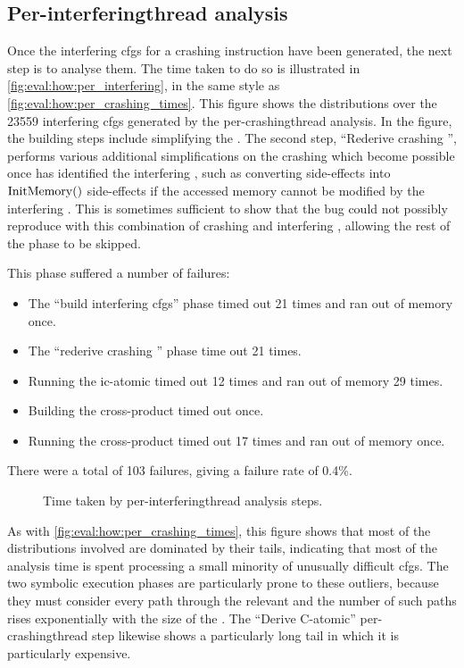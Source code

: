 \subsection{Per-\gls{interferingthread} analysis}

Once the interfering \glspl{cfg} for a crashing instruction have been
generated, the next step is to analyse them.  The time taken to do so
is illustrated in \autoref{fig:eval:how:per_interfering}, in the same
style as \autoref{fig:eval:how:per_crashing_times}.  This figure shows
the distributions over the 23559 interfering \glspl{cfg} generated by
the per-\gls{crashingthread} analysis.  In the figure, the
{\StateMachine} building steps include simplifying the
{\StateMachines}.  The second step, ``Rederive crashing
{\StateMachine}'', performs various additional simplifications on the
crashing {\StateMachine} which become possible once {\technique} has
identified the interfering {\StateMachine}, such as converting
\stLoad{}{} side-effects into $\mathrm{InitMemory}()$ side-effects if the accessed
memory cannot be modified by the interfering {\StateMachine}.  This is
sometimes sufficient to show that the bug could not possibly reproduce
with this combination of crashing and interfering {\StateMachines},
allowing the rest of the phase to be skipped.  

This phase suffered a number of failures:
\begin{itemize}
\item The ``build interfering \glspl{cfg}'' phase timed out 21 times
  and ran out of memory once.
\item The ``rederive crashing {\StateMachine}'' phase time out 21
  times.
\item Running the \gls{ic-atomic} {\StateMachine} timed out 12 times
  and ran out of memory 29 times.
\item Building the cross-product {\StateMachine} timed out once.
\item Running the cross-product {\StateMachine} timed out 17 times and
  ran out of memory once.
\end{itemize}
There were a total of 103 failures, giving a failure rate of 0.4\%.

\begin{figure}
  \centerline{
  }
  \caption{Time taken by per-\gls{interferingthread} analysis steps.}
\end{figure}

As with \autoref{fig:eval:how:per_crashing_times}, this figure shows
that most of the distributions involved are dominated by their tails,
indicating that most of the analysis time is spent processing a small
minority of unusually difficult \glspl{cfg}.  The two symbolic
execution phases are particularly prone to these outliers, because
they must consider every path through the relevant {\StateMachine} and
the number of such paths rises exponentially with the size of the
{\StateMachine}.  The ``Derive C-atomic'' per-\gls{crashingthread}
step likewise shows a particularly long tail in which it is
particularly expensive.

